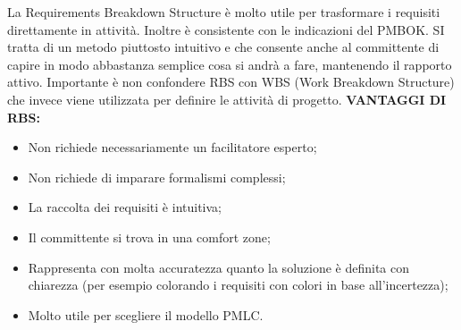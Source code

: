 La Requirements Breakdown Structure è molto utile per trasformare i requisiti direttamente in attività. Inoltre è consistente con le indicazioni del PMBOK. SI tratta di un metodo piuttosto intuitivo e che consente anche al committente di capire in modo abbastanza semplice cosa si andrà a fare, mantenendo il rapporto attivo. Importante è non confondere RBS con WBS (Work Breakdown Structure) che invece viene utilizzata per definire le attività di progetto.\newline
\textbf{VANTAGGI DI RBS:}
\begin{itemize}
	\item Non richiede necessariamente un facilitatore esperto;
	\item Non richiede di imparare formalismi complessi;
	\item La raccolta dei requisiti è intuitiva;
	\item Il committente si trova in una comfort zone;
	\item Rappresenta con molta accuratezza quanto la soluzione è definita con chiarezza (per esempio colorando i requisiti con colori in base all'incertezza);
	\item Molto utile per scegliere il modello PMLC.
\end{itemize}
